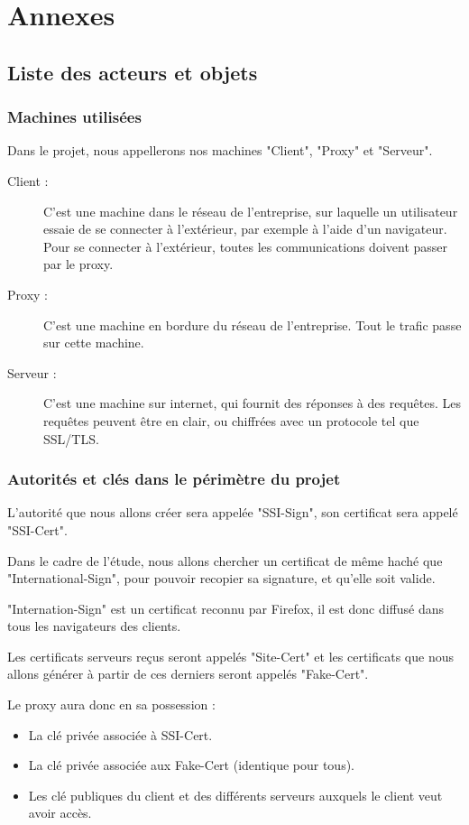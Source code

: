 \documentclass[a4paper,11pt,french]{article}
\begin{document}
\newpage
\section{Annexes}


\subsection{Liste des acteurs et objets}

\subsubsection{Machines utilisées}
Dans le projet, nous appellerons nos machines "Client", "Proxy" et "Serveur".
\begin{description}
\item[Client :] C'est une machine dans le réseau de l'entreprise, sur laquelle un utilisateur essaie de se connecter à l'extérieur, par exemple à l'aide d'un navigateur. Pour se connecter à l'extérieur, toutes les communications doivent passer par le proxy.
\item[Proxy :] C'est une machine en bordure du réseau de l'entreprise. Tout le trafic passe sur cette machine.
\item[Serveur :] C'est une machine sur internet, qui fournit des réponses à des requêtes. Les requêtes peuvent être en clair, ou chiffrées avec un protocole tel que SSL/TLS.
\end{description}





\subsubsection{Autorités et clés dans le périmètre du projet}
L'autorité que nous allons créer sera appelée "SSI-Sign", son certificat sera appelé "SSI-Cert".

Dans le cadre de l'étude, nous allons chercher un certificat de même haché que "International-Sign", pour pouvoir recopier sa signature, et qu'elle soit valide.

"Internation-Sign" est un certificat reconnu par Firefox, il est donc diffusé dans tous les navigateurs des clients.

Les certificats serveurs reçus seront appelés "Site-Cert" et les certificats que nous allons générer à partir de ces derniers seront appelés "Fake-Cert".

Le proxy aura donc en sa possession :
\begin{itemize}
\item La clé privée associée à SSI-Cert.
\item La clé privée associée aux Fake-Cert (identique pour tous).
\item Les clé publiques du client et des différents serveurs auxquels le client veut avoir accès.
\end{itemize}
\end{document}

